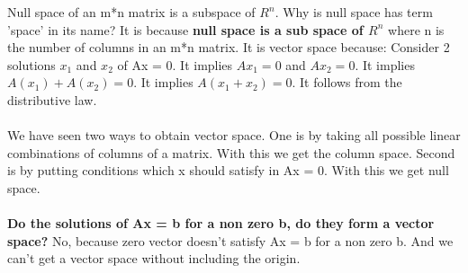 \documentclass{article}
\begin{document}
Null space of an m*n matrix is a subspace of $R^n$. \newline
Why is null space has term 'space' in its name?
It is because \textbf{null space is a sub space of $R^n$} where n is the number of columns in an m*n matrix. It is vector space because: Consider 2 solutions $x_1$ and $x_2$ of 
Ax = 0. It implies $Ax_1 = 0$ and $Ax_2 = 0$. It implies  $A(x_1) + A(x_2) = 0$. It implies  $A(x_1 + x_2) = 0$. It follows from the distributive law.
\\~\\
We have seen two ways to obtain vector space. One is by taking all possible linear combinations of columns of a matrix. With this we get the column space. Second is by putting conditions which x should satisfy in Ax = 0. With this we get null space.
\\~\\
\textbf{Do the solutions of Ax = b for a non zero b, do they form a vector space? } No, because zero vector doesn't satisfy Ax = b for a  non zero b. And we can't get a vector space without including the origin.
\end{document}
